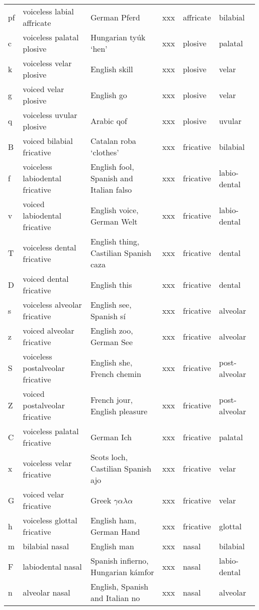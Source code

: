 {\begin{longtable}{l|p{.3\linewidth}|p{.15\linewidth}|l|p{.15\linewidth}|l}
	pf	& voiceless labial affricate	& German Pferd	& xxx	& affricate	& bilabial	\\
	c	& voiceless palatal plosive	& Hungarian tyúk `hen'	& xxx	& plosive	& palatal	\\
	k	& voiceless velar plosive	& English skill	& xxx	& plosive	& velar	\\
	g	& voiced velar plosive	& English go	& xxx	& plosive	& velar	\\
	q	& voiceless uvular plosive	& Arabic qof	& xxx	& plosive	& uvular	\\
	B	& voiced bilabial fricative	& Catalan roba `clothes'	& xxx	& fricative	& bilabial	\\
	f	& voiceless labiodental fricative	& English fool, Spanish and Italian falso	& xxx	& fricative	& labio-dental	\\
	v	& voiced labiodental fricative	& English voice, German Welt	& xxx	& fricative	& labio-dental	\\
	T	& voiceless dental fricative	& English thing, Castilian Spanish caza	& xxx	& fricative	& dental	\\
	D	& voiced dental fricative	& English this	& xxx	& fricative	& dental\\
	s	& voiceless alveolar fricative	& English see, Spanish sí	& xxx	& fricative	& alveolar	\\
	z	& voiced alveolar fricative	& English zoo, German See	& xxx	& fricative	& alveolar	\\
	S	& voiceless postalveolar fricative	& English she, French chemin	& xxx	& fricative	& post-alveolar	\\
	Z	& voiced postalveolar fricative	& French jour, English pleasure	& xxx	& fricative	& post-alveolar	\\
	C	& voiceless palatal fricative	& German Ich	& xxx	& fricative	& palatal	\\
	x	& voiceless velar fricative	& Scots loch, Castilian Spanish ajo	& xxx	& fricative	& velar	\\
	G	& voiced velar fricative	& Greek $\gamma\alpha\lambda\alpha$	& xxx	& fricative	& velar	\\
	h	& voiceless glottal fricative	& English ham, German Hand	& xxx	& fricative	& glottal	\\
	m	& bilabial nasal	& English man	& xxx	& nasal	& bilabial	\\
	F	& labiodental nasal	& Spanish infierno, Hungarian kámfor	& xxx	& nasal	& labio-dental	\\
	n	& alveolar nasal	& English, Spanish and Italian no	& xxx	& nasal	& alveolar	\\

\end{longtable}}
